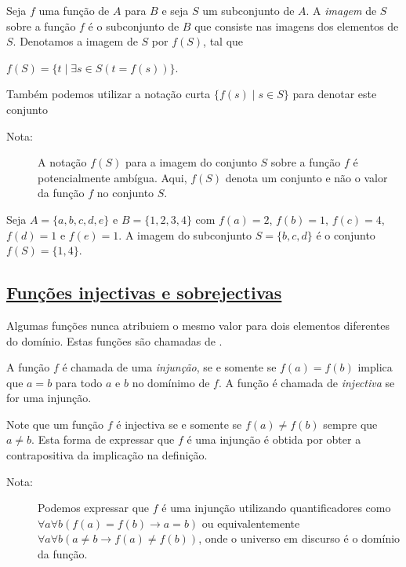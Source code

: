 \begin{defn}
\label{def318}
Seja $f$ uma função de $A$ para  $B$ e seja $S$ um subconjunto de $A$. A
\emph{imagem} de $S$ sobre a função $f$ é o subconjunto de $B$ que consiste nas
imagens dos elementos de $S$. Denotamos a imagem de $S$ por $f(S)$, tal que
\begin{center}
$f(S) = \{t \mid \exists s \in S (t = f(s))\}$.
\end{center}
Também podemos utilizar a notação curta $\{f(s) \mid s \in S\}$ para denotar
este conjunto
\begin{description}
\item[Nota:]A notação $f(S)$ para a imagem do conjunto $S$ sobre a função $f$ é
potencialmente ambígua. Aqui, $f(S)$ denota um conjunto e não o valor da função
$f$ no conjunto $S$.
\end{description}
\end{defn}

\begin{exmp}
\label{exem328}
Seja $A = \{a,b,c,d,e\}$ e $B=\{1,2,3,4\}$ com $f(a)=2$, $f(b)=1$, $f(c)=4$,
$f(d)=1$ e $f(e)=1$. A imagem do subconjunto $S=\{b,c,d\}$ é o conjunto
$f(S)=\{1,4\}$.
\end{exmp}


\subsection*{\underline{Funções injectivas e sobrejectivas}}

Algumas funções nunca atribuiem o mesmo valor para dois elementos diferentes do
domínio. Estas funções são chamadas de .

\begin{defn}
\label{def320}
A função $f$ é chamada de uma \emph{injunção}, se e somente se $f(a) = f(b)$
implica que $a=b$ para todo $a$ e $b$ no domínimo de $f$. A função é chamada de
\emph{injectiva} se for uma injunção.
\end{defn}

Note que um função $f$ é injectiva se e somente se $f(a) \neq f(b)$ sempre que
$a \neq b$. Esta forma de expressar que $f$ é uma injunção é obtida por obter a
contrapositiva da implicação na definição.

\begin{description}
\item[Nota:]Podemos expressar que $f$ é uma injunção utilizando quantificadores
como $\forall a\forall b (f(a)=f(b) \to a = b)$ ou equivalentemente $\forall
a\forall b(a \neq b \to f(a) \neq f(b))$, onde o universo em discurso é o
domínio da função.
\end{description}

